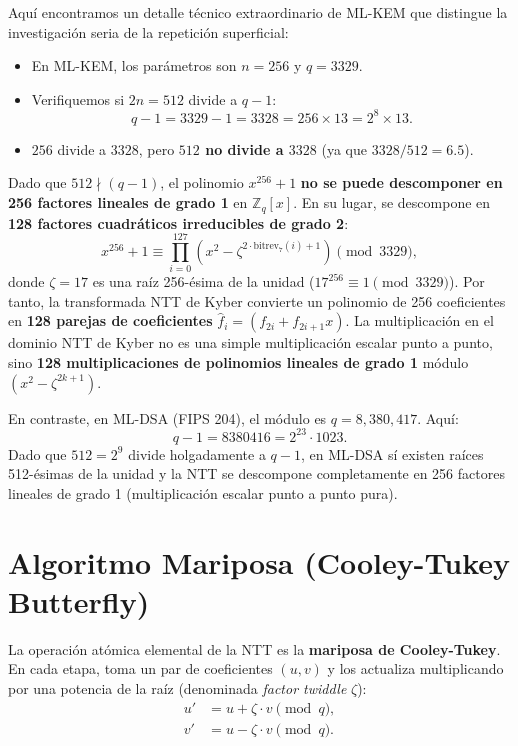\documentclass[11pt,a4paper,twoside,openright]{book}
\theoremstyle{plain}
\theoremstyle{definition}
\theoremstyle{remark}
\newcommand{\Zq}{\mathbb{Z}_q}
\newcommand{\MLKEM}{\textsf{ML-KEM}}
\newcommand{\MLDSA}{\textsf{ML-DSA}}
\begin{document}
Aqu\'i encontramos un detalle t\'ecnico extraordinario de \MLKEM{} que distingue la investigaci\'on seria de la repetici\'on superficial:
\begin{itemize}
  \item En \MLKEM{}, los par\'ametros son $n = 256$ y $q = 3329$.
  \item Verifiquemos si $2n = 512$ divide a $q-1$:
  \[
    q - 1 = 3329 - 1 = 3328 = 256 \times 13 = 2^8 \times 13.
  \]
  \item $256$ divide a $3328$, pero \textbf{$512$ no divide a $3328$} (ya que $3328 / 512 = 6.5$).
\end{itemize}

\begin{intuicion}
Dado que $512 \nmid (q-1)$, el polinomio $x^{256} + 1$ \textbf{no se puede descomponer en 256 factores lineales de grado 1} en $\Zq[x]$.
En su lugar, se descompone en \textbf{128 factores cuadr\'aticos irreducibles de grado 2}:
\[
  x^{256} + 1 \equiv \prod_{i=0}^{127} (x^2 - \zeta^{2 \cdot \mathrm{bitrev}_7(i) + 1}) \pmod{3329},
\]
donde $\zeta = 17$ es una ra\'iz 256-\'esima de la unidad ($17^{256} \equiv 1 \pmod{3329}$).
Por tanto, la transformada NTT de Kyber convierte un polinomio de 256 coeficientes en \textbf{128 parejas de coeficientes} $\hat{f}_i = (f_{2i} + f_{2i+1} x)$. La multiplicaci\'on en el dominio NTT de Kyber no es una simple multiplicaci\'on escalar punto a punto, sino \textbf{128 multiplicaciones de polinomios lineales de grado 1} m\'odulo $(x^2 - \zeta^{2k+1})$.
\end{intuicion}

En contraste, en \MLDSA{} (FIPS 204), el m\'odulo es $q = 8,380,417$. Aqu\'i:
\[
  q - 1 = 8380416 = 2^{23} \cdot 1023.
\]
Dado que $512 = 2^9$ divide holgadamente a $q-1$, en \MLDSA{} s\'i existen ra\'ices 512-\'esimas de la unidad y la NTT se descompone completamente en 256 factores lineales de grado 1 (multiplicaci\'on escalar punto a punto pura).

\section{Algoritmo Mariposa (Cooley-Tukey Butterfly)}

La operaci\'on at\'omica elemental de la NTT es la \textbf{mariposa de Cooley-Tukey}. En cada etapa, toma un par de coeficientes $(u, v)$ y los actualiza multiplicando por una potencia de la ra\'iz (denominada \emph{factor twiddle} $\zeta$):
\begin{align}
  u' &= u + \zeta \cdot v \pmod q, \\
  v' &= u - \zeta \cdot v \pmod q.
\end{align}
\end{document}
